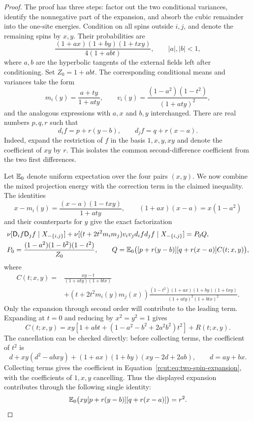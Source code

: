 \begin{proof}
The proof has three steps: factor out the two conditional variances,
identify the nonnegative part of the expansion, and absorb the cubic
remainder into the one-site energies.  Condition on all spins outside
$i,j$, and denote the remaining spins by $x,y$.  Their probabilities are
\[
 \frac{(1+ax)(1+by)(1+txy)}{4(1+abt)},
 \qquad |a|,|b|<1,
\]
where $a,b$ are the hyperbolic tangents of the external fields left after
conditioning.  Set $Z_0=1+abt$.  The corresponding conditional means
and variances take the form
\[
 m_i(y)=\frac{a+ty}{1+aty},\qquad
 v_i(y)=\frac{(1-a^2)(1-t^2)}{(1+aty)^2},
\]
and the analogous expressions with $a,x$ and $b,y$ interchanged.
There are real numbers $p,q,r$ such that
\[
 d_i f=p+r(y-b),\qquad d_j f=q+r(x-a).
\]
Indeed, expand the restriction of $f$ in the basis $1,x,y,xy$ and
denote the coefficient of $xy$ by $r$.  This isolates the common
second-difference coefficient from the two first differences.

Let $\mathbb E_0$ denote uniform expectation over the four pairs $(x,y)$.
We now combine the mixed projection energy with the correction term in
the claimed inequality.  The identities
\[
 x-m_i(y)=\frac{(x-a)(1-txy)}{1+aty},
 \qquad (1+ax)(x-a)=x(1-a^2)
\]
and their counterparts for $y$ give the exact factorization
\begin{align*}
 &\nu[\mathsf D_i f\mathsf D_j f\mid X_{-\{i,j\}}]
 +\nu[(t+2t^2m_i m_j)v_i v_jd_i f d_j f\mid X_{-\{i,j\}}]
   =P_0Q,\\
 &P_0=\frac{(1-a^2)(1-b^2)(1-t^2)}{Z_0},\qquad
 Q=\mathbb E_0\bigl([p+r(y-b)][q+r(x-a)]C(t;x,y)\bigr),
\end{align*}
where
\begin{align*}
 C(t;x,y)
 ={}&\frac{xy-t}{(1+aty)(1+btx)}\\
 &+(t+2t^2m_i(y)m_j(x))
  \frac{(1-t^2)(1+ax)(1+by)(1+txy)}
       {(1+aty)^2(1+btx)^2}.
\end{align*}
Only the expansion through second order will contribute to the leading
term.  Expanding at $t=0$ and reducing by $x^2=y^2=1$ gives
\begin{equation}
 C(t;x,y)
 =xy\left[1+ab t+(1-a^2-b^2+2a^2b^2)t^2\right]
   +R(t;x,y).
 \label{rcut:eq:two-spin-expansion}
\end{equation}
The cancellation can be checked directly: before collecting terms, the
coefficient of $t^2$ is
\[
 d+xy(d^2-abxy)+(1+ax)(1+by)(xy-2d+2ab),
 \qquad d=ay+bx.
\]
Collecting terms gives the coefficient in
Equation~\eqref{rcut:eq:two-spin-expansion}, with the coefficients of
$1,x,y$ cancelling.  Thus the displayed expansion contributes through
the following single identity:
\[
 \mathbb E_0\bigl(xy[p+r(y-b)][q+r(x-a)]\bigr)=r^2.
\]


\end{proof}
